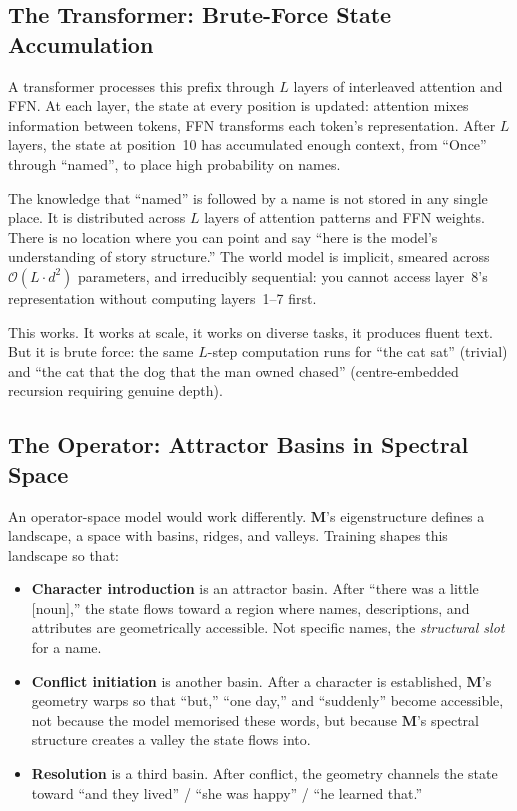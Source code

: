 \documentclass[11pt, a4paper]{article}
\newcommand{\M}{\mathbf{M}}
\newcommand{\bigO}{\mathcal{O}}
\theoremstyle{plain}
\theoremstyle{definition}
\theoremstyle{remark}
\begin{document}
\subsection{The Transformer: Brute-Force State Accumulation}

A transformer processes this prefix through $L$ layers of interleaved attention and FFN.
At each layer, the state at every position is updated: attention mixes information between tokens, FFN transforms each token's representation.
After $L$ layers, the state at position~10 has accumulated enough context, from ``Once'' through ``named'', to place high probability on names.

The knowledge that ``named'' is followed by a name is not stored in any single place.
It is distributed across $L$ layers of attention patterns and FFN weights.
There is no location where you can point and say ``here is the model's understanding of story structure.''
The world model is implicit, smeared across $\bigO(L \cdot d^2)$ parameters, and irreducibly sequential: you cannot access layer~8's representation without computing layers~1--7 first.

This works.
It works at scale, it works on diverse tasks, it produces fluent text.
But it is brute force: the same $L$-step computation runs for ``the cat sat'' (trivial) and ``the cat that the dog that the man owned chased'' (centre-embedded recursion requiring genuine depth).

\subsection{The Operator: Attractor Basins in Spectral Space}

An operator-space model would work differently.
$\M$'s eigenstructure defines a landscape, a space with basins, ridges, and valleys.
Training shapes this landscape so that:

\begin{itemize}[nosep]
\item \textbf{Character introduction} is an attractor basin.
      After ``there was a little [noun],'' the state flows toward a region where names, descriptions, and attributes are geometrically accessible.
      Not specific names, the \emph{structural slot} for a name.

\item \textbf{Conflict initiation} is another basin.
      After a character is established, $\M$'s geometry warps so that ``but,'' ``one day,'' and ``suddenly'' become accessible, not because the model memorised these words, but because $\M$'s spectral structure creates a valley the state flows into.

\item \textbf{Resolution} is a third basin.
      After conflict, the geometry channels the state toward ``and they lived'' / ``she was happy'' / ``he learned that.''
\end{itemize}
\end{document}
